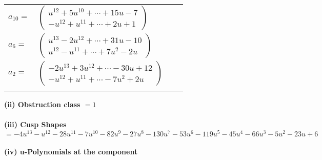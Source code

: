 \documentclass[1p]{elsarticle_modified}
\theoremstyle{definition}
\begin{document}
\begin{tabular}{m{7pt} m{180pt} m{7pt} m{180pt} }
\flushright $a_{10}=$&$\begin{pmatrix}u^{12}+5 u^{10}+\cdots+15 u-7\\- u^{12}+u^{11}+\cdots+2 u+1\end{pmatrix}$ \\
\flushright $a_{6}=$&$\begin{pmatrix}u^{13}-2 u^{12}+\cdots+31 u-10\\u^{12}- u^{11}+\cdots+7 u^2-2 u\end{pmatrix}$ \\
\flushright $a_{2}=$&$\begin{pmatrix}-2 u^{13}+3 u^{12}+\cdots-30 u+12\\- u^{12}+u^{11}+\cdots-7 u^2+2 u\end{pmatrix}$\\&\end{tabular}
\flushleft \textbf{(ii) Obstruction class $= 1$}\\~\\
\flushleft \textbf{(iii) Cusp Shapes $= -4 u^{13}- u^{12}-28 u^{11}-7 u^{10}-82 u^9-27 u^8-130 u^7-53 u^6-119 u^5-45 u^4-66 u^3-5 u^2-23 u+6$}\\~\\
\newpage\renewcommand{\arraystretch}{1}
\flushleft \textbf{(iv) u-Polynomials at the component}\newline \\
\end{document}
